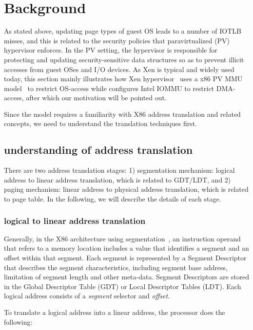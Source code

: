 \section{Background} \label{sec:background}

As stated above, updating page types of guest OS leads to a number of IOTLB misses, and this is related to the security policies that paravirtualized (PV) hypervisor enforces. In the PV setting, the hypervisor is responsible for protecting and updating security-sensitive data structures so as to prevent illicit accesses from guest OSes and I/O devices. As Xen is typical and widely used today, this section mainly illustrates how Xen hypervisor~\cite{XEN-SOPS03} uses a x86 PV MMU model~\cite{x86-pv-model} to restrict OS-access while configures Intel IOMMU to restrict DMA-access, after which our motivation will be pointed out.

Since the model requires a familiarity with X86 address translation and related concepts, we need to understand the translation techniques first.

\subsection{understanding of address translation}

There are two address translation stages: 1) segmentation mechanism: logical address to linear address translation, which is related to GDT/LDT, and 2) paging mechanism: linear address to physical address translation, which is related to page table. In the following, we will describe the details of each stage.

\subsubsection{logical to linear address translation}

Generally, in the X86 architecture using segmentation~\cite{x86}, an instruction operand that refers to a memory location includes a value that identifies a segment and an offset within that segment. Each segment is represented by a Segment Descriptor that describes the segment characteristics, including segment base address, limitation of segment length and other meta-data. Segment Descriptors are stored in the Global Descriptor Table (GDT) or Local Descriptor Tables (LDT). Each logical address consists of a \emph{segment} selector and \emph{offset}.

To translate a logical address into a linear address, the processor does the following:

